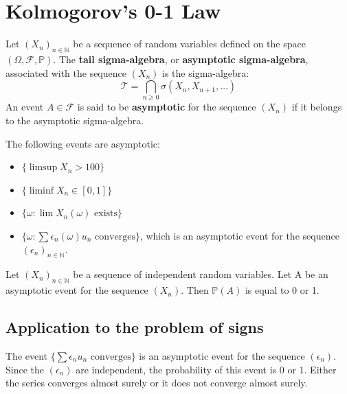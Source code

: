 \section{Kolmogorov's 0-1 Law}%
\begin{definition}
Let $(X_n)_{n \in \mathbb{N}}$ be a sequence of random variables defined on the space $(\Omega, \mathcal{F}, \mathbb{P})$.
The \textbf{tail sigma-algebra}, or \textbf{asymptotic sigma-algebra}, associated with the sequence $(X_n)$ is the sigma-algebra:
\[ \mathcal{T} = \bigcap_{n \ge 0} \sigma(X_n, X_{n+1}, \dots) \]
An event $A \in \mathcal{F}$ is said to be \textbf{asymptotic} for the sequence $(X_n)$ if it belongs to the asymptotic sigma-algebra.
\end{definition}%
\begin{example}
The following events are asymptotic:
\begin{itemize}
    \item $\{ \limsup X_n > 100 \}$
    \item $\{ \liminf X_n \in [0,1] \}$
    \item $\{ \omega : \lim X_n(\omega) \text{ exists} \}$
    \item $\{ \omega : \sum \epsilon_n(\omega) u_n \text{ converges} \}$, which is an asymptotic event for the sequence $(\epsilon_n)_{n \in \mathbb{N}}$.
\end{itemize}
\end{example}%
\begin{theorem}
Let $(X_n)_{n \in \mathbb{N}}$ be a sequence of independent random variables.
Let A be an asymptotic event for the sequence $(X_n)$. Then $\mathbb{P}(A)$ is equal to 0 or 1.
\end{theorem}%
\subsection*{Application to the problem of signs}%
The event $\{\sum \epsilon_n u_n \text{ converges}\}$ is an asymptotic event for the sequence $(\epsilon_n)$. Since the $(\epsilon_n)$ are independent, the probability of this event is 0 or 1.
Either the series converges almost surely or it does not converge almost surely.%
